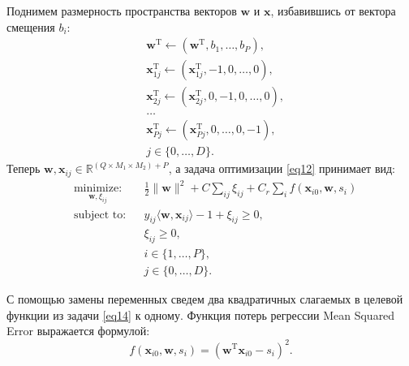 \documentclass[preprint,12pt,3p]{elsarticle}
\begin{document}
Поднимем размерность пространства векторов $\mathbf{w}$ и $\mathbf{x}$, избавившись от вектора смещения $b_i$:
\begin{equation}\label{eq13}
\begin{split}
& \mathbf{w}^{\text{T}}\leftarrow(\mathbf{w}^{\text{T}}, b_1, \dots, b_P),\\
& \mathbf{x}_{1j}^{\text{T}}\leftarrow(\mathbf{x}_{1j}^{\text{T}}, -1, 0, \dots, 0),\\
& \mathbf{x}_{2j}^{\text{T}}\leftarrow(\mathbf{x}_{2j}^{\text{T}}, 0, -1, 0, \dots, 0),\\
& \dots \\
& \mathbf{x}_{Pj}^{\text{T}}\leftarrow(\mathbf{x}_{Pj}^{\text{T}}, 0, \dots, 0, -1), \\
&j\in\{0,\dots,D\}.
\end{split}
\end{equation}
Теперь $\mathbf{w}, \mathbf{x}_{ij} \in \mathbb{R}^{(Q\times M_1\times M_2) + P}$, а задача оптимизации \eqref{eq12} принимает вид: 
\begin{equation}\label{eq14}
\begin{aligned}
& \underset{{\mathbf{w}}, \xi_{ij}}{\text{minimize:}}
& & \frac{1}{2} \|{\mathbf{w}}\|^2 + C\sum\limits_{ij}\xi_{ij} + C_{r}\sum\limits_{i} f({\mathbf{x}}_{i0},{\mathbf{w}}, s_i) \\
& \text{subject to:}
& & y_{ij}\langle{\mathbf{w}},{\mathbf{x}}_{ij}\rangle-1+\xi_{ij} \geq 0, \\
&&& \xi_{ij} \geq 0, \\
&&&i\in\{1,\dots,P\}, \\
&&&j\in\{0,\dots,D\}.
\end{aligned}
\end{equation}

С помощью замены переменных сведем два квадратичных слагаемых в целевой функции из задачи \eqref{eq14} к одному. Функция потерь регрессии Mean Squared Error выражается формулой:
\begin{equation}\label{eq15}
f({\mathbf{x}}_{i0}, {\mathbf{w}}, s_i) = ({\mathbf{w}}^{\text{T}}{\mathbf{x}}_{i0} - s_i)^2.
\end{equation}
\end{document}
